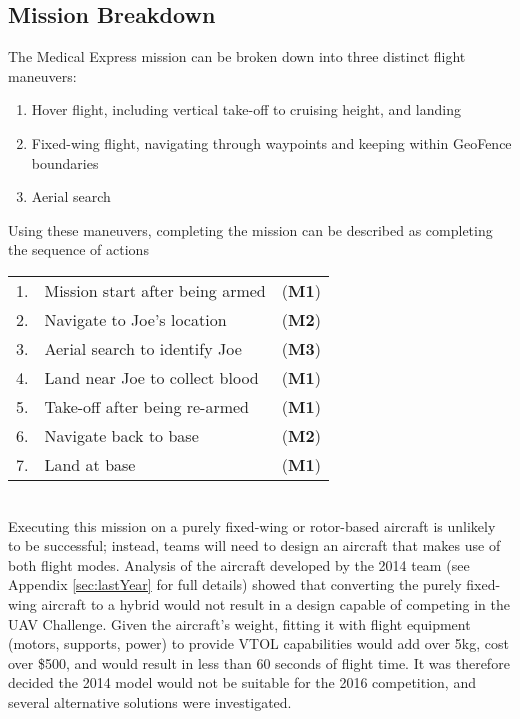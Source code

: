 \subsection{Mission Breakdown}
\label{sec:flightmaneuvers}
The Medical Express mission can be broken down into three distinct flight maneuvers:
\begin{enumerate}[label=\bfseries M\arabic*:] \itemsep-2pt
	\item Hover flight, including vertical take-off to cruising height, and landing
	\item Fixed-wing flight, navigating through waypoints and keeping within GeoFence boundaries
	\item Aerial search
\end{enumerate}

Using these maneuvers, completing the mission can be described as completing the sequence of actions\\
\begin{tabular}{r l l}
	1. & Mission start after being armed & (\textbf{M1}) \\ 
	2. & Navigate to Joe's location & (\textbf{M2}) \\ 
	3. & Aerial search to identify Joe & (\textbf{M3}) \\ 
	4. & Land near Joe to collect blood & (\textbf{M1}) \\ 
	5. & Take-off after being re-armed & (\textbf{M1}) \\ 
	6. & Navigate back to base & (\textbf{M2}) \\ 
	7. & Land at base & (\textbf{M1}) \\ 
\end{tabular}\\

Executing this mission on a purely fixed-wing or rotor-based aircraft is unlikely to be successful; instead, teams will need to design an aircraft that makes use of both flight modes. Analysis of the aircraft developed by the 2014 team (see Appendix \ref{sec:lastYear} for full details) showed that converting the purely fixed-wing aircraft to a hybrid would not result in a design capable of competing in the UAV Challenge. Given the aircraft's weight, fitting it with flight equipment (motors, supports, power) to provide VTOL capabilities would add over 5kg, cost over \$500, and would result in less than 60 seconds of flight time. It was therefore decided the 2014 model would not be suitable for the 2016 competition, and several alternative solutions were investigated.\\


